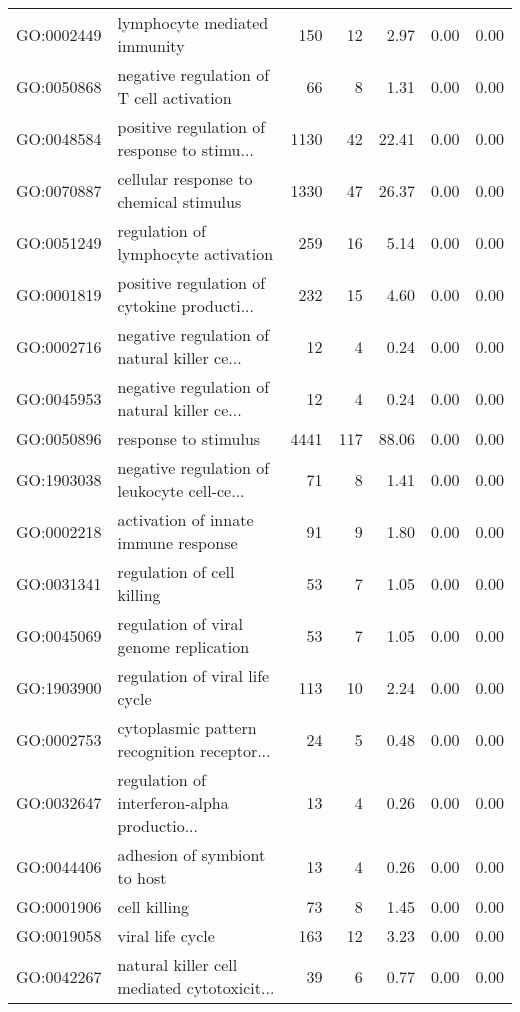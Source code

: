 \begin{table}[ht]
\begin{tabular}{llrrrrr}
  GO:0002449 & lymphocyte mediated immunity & 150 &  12 & 2.97 & 0.00 & 0.00 \\ 
  GO:0050868 & negative regulation of T cell activation &  66 &   8 & 1.31 & 0.00 & 0.00 \\ 
  GO:0048584 & positive regulation of response to stimu... & 1130 &  42 & 22.41 & 0.00 & 0.00 \\ 
  GO:0070887 & cellular response to chemical stimulus & 1330 &  47 & 26.37 & 0.00 & 0.00 \\ 
  GO:0051249 & regulation of lymphocyte activation & 259 &  16 & 5.14 & 0.00 & 0.00 \\ 
  GO:0001819 & positive regulation of cytokine producti... & 232 &  15 & 4.60 & 0.00 & 0.00 \\ 
  GO:0002716 & negative regulation of natural killer ce... &  12 &   4 & 0.24 & 0.00 & 0.00 \\ 
  GO:0045953 & negative regulation of natural killer ce... &  12 &   4 & 0.24 & 0.00 & 0.00 \\ 
  GO:0050896 & response to stimulus & 4441 & 117 & 88.06 & 0.00 & 0.00 \\ 
  GO:1903038 & negative regulation of leukocyte cell-ce... &  71 &   8 & 1.41 & 0.00 & 0.00 \\ 
  GO:0002218 & activation of innate immune response &  91 &   9 & 1.80 & 0.00 & 0.00 \\ 
  GO:0031341 & regulation of cell killing &  53 &   7 & 1.05 & 0.00 & 0.00 \\ 
  GO:0045069 & regulation of viral genome replication &  53 &   7 & 1.05 & 0.00 & 0.00 \\ 
  GO:1903900 & regulation of viral life cycle & 113 &  10 & 2.24 & 0.00 & 0.00 \\ 
  GO:0002753 & cytoplasmic pattern recognition receptor... &  24 &   5 & 0.48 & 0.00 & 0.00 \\ 
  GO:0032647 & regulation of interferon-alpha productio... &  13 &   4 & 0.26 & 0.00 & 0.00 \\ 
  GO:0044406 & adhesion of symbiont to host &  13 &   4 & 0.26 & 0.00 & 0.00 \\ 
  GO:0001906 & cell killing &  73 &   8 & 1.45 & 0.00 & 0.00 \\ 
  GO:0019058 & viral life cycle & 163 &  12 & 3.23 & 0.00 & 0.00 \\ 
  GO:0042267 & natural killer cell mediated cytotoxicit... &  39 &   6 & 0.77 & 0.00 & 0.00 \\ 
   \hline
\end{tabular}
\end{table}

